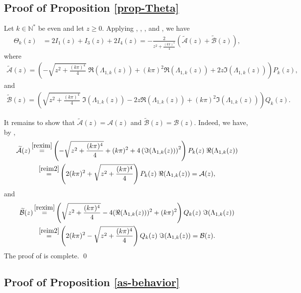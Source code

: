 \documentclass[11pt, reqno]{amsart}
\theoremstyle{plain}
\numberwithin{equation}{section}
\newcommand{\mN}{\mathbb{N}}
\begin{document}
\subsection{Proof of Proposition \ref{prop-Theta}} \label{sect-prop-Theta} Let $k \in \mN^*$ be even and let $z \geq 0$. Applying , , , and , we have 
    \begin{align*}	
        \Theta_k(z) &= 2I_1(z) + I_3(z) + 2I_4(z) = - \frac{2}{z^2 + \frac{(k \pi)^4}{4}} \left(\widetilde{\mathcal{A}}(z) + \widetilde{\mathcal{B}}(z) \right),
    \end{align*}  
    where
    \begin{align*}
    \widetilde{\mathcal{A}}(z) = \left(- \sqrt{z^2 + \frac{(k \pi)^4}{4} } \;\Re(\Lambda_{1,k}(z)) + (k \pi)^2\Re (\Lambda_{1,k}(z)) + 2z \Im (\Lambda_{1,k}(z)) \right) P_k(z),
    \end{align*}
    and
    \begin{align*}
    \widetilde{\mathcal{B}}(z) = \left(\sqrt{z^2 + \frac{(k \pi)^4}{4} } \; \Im (\Lambda_{1,k}(z)) - 2 z\Re(\Lambda_{1,k}(z)) + (k \pi)^2 \Im (\Lambda_{1,k}(z)) \right) Q_k(z).
    \end{align*}
    
    It remains to show that $\widetilde{\mathcal{A}}(z) = \mathcal{A}(z)$ and $ \widetilde{\mathcal{B}}(z) =  \mathcal{B}(z)$. Indeed, we have, by ,  
   \begin{multline*}
        \widetilde{\mathcal{A}}(z) \mathop{=}^{\eqref{rexim}}  \left(- \sqrt{z^2 + \frac{(k \pi)^4}{4}} + (k \pi)^2  + 4 \left(\Im (\Lambda_{1,k}(z)) \right)^2 \right) P_k(z) \;\Re (\Lambda_{1,k}(z))\\
        \mathop{=}^{\eqref{reim2}} \left(2(k \pi)^2 + \sqrt{z^2 + \frac{(k \pi)^4}{4}}\right) P_k(z) \;\Re (\Lambda_{1,k}(z)) = \mathcal{A}(z),
    \end{multline*}
    and 
    \begin{multline*}
        \widetilde{\mathcal{B}}(z)  \mathop{=}^{\eqref{rexim}}  \left( \sqrt{z^2 + \frac{(k \pi)^4}{4}} - 4 (\Re (\Lambda_{1,k}(z)))^2 + (k \pi)^2 \right) Q_k(z) \; \Im (\Lambda_{1,k}(z))  \\
        \mathop{=}^{\eqref{reim2}} \left(2(k \pi)^2 - \sqrt{z^2 + \frac{(k \pi)^4}{4}} \right) Q_k(z) \; \Im (\Lambda_{1,k}(z)) = \mathcal{B}(z).
    \end{multline*}
The proof of  is complete.
\qed

\subsection{Proof of Proposition \ref{as-behavior}} \label{sect-as-behavior}
\end{document}
